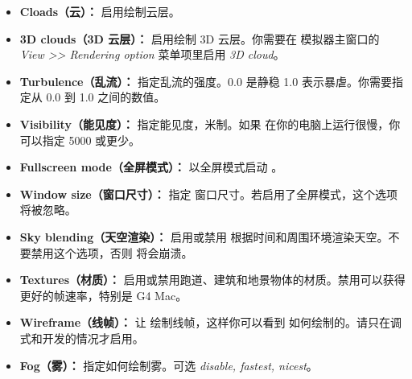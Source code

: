 \begin{itemize}
\item \textbf{Cloads（云）：} 启用绘制云层。
\item \textbf{3D clouds（3D 云层）：} 启用绘制 3D 云层。你需要在 \FlightGear{} 模拟器主窗口的 \textit{View >> Rendering option} 菜单项里启用 \textit{3D cloud}。
\item \textbf{Turbulence（乱流）：} 指定乱流的强度。0.0 是静稳 1.0 表示暴虐。你需要指定从 0.0 到 1.0 之间的数值。
\item \textbf{Visibility（能见度）：} 指定能见度，米制。如果 \FlightGear{} 在你的电脑上运行很慢，你可以指定 5000 或更少。
\item \textbf{Fullscreen mode（全屏模式）：} 以全屏模式启动 \FlightGear{}。
\item \textbf{Window size（窗口尺寸）：} 指定 \FlightGear{} 窗口尺寸。若启用了全屏模式，这个选项将被忽略。
\item \textbf{Sky blending（天空渲染）：} 启用或禁用 \FlightGear{} 根据时间和周围环境渲染天空。不要禁用这个选项，否则 \FlightGear{} 将会崩溃。
\item \textbf{Textures（材质）：} 启用或禁用跑道、建筑和地景物体的材质。禁用可以获得更好的帧速率，特别是 G4 Mac。
\item \textbf{Wireframe（线帧）：} 让 \FlightGear{} 绘制线帧，这样你可以看到 \FlightGear{} 如何绘制的。请只在调式和开发的情况才启用。
\item \textbf{Fog（雾）：} 指定如何绘制雾。可选 \textit{disable, fastest, nicest}。
\end{itemize}
\fi
